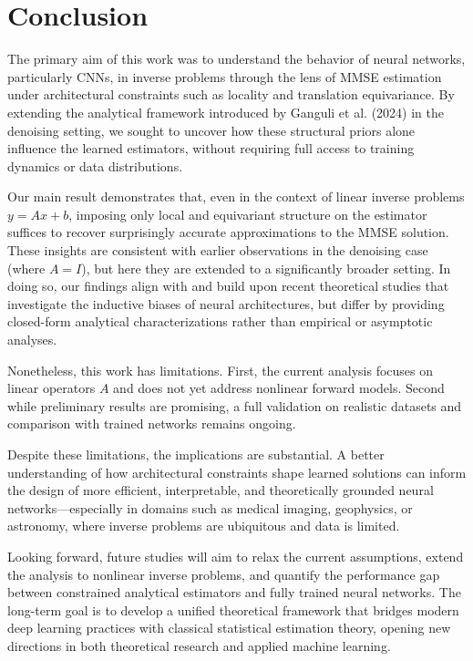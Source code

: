 \documentclass[a4paper,10pt]{article}
\theoremstyle{definition} %
\theoremstyle{definition} %
\theoremstyle{definition} %
\theoremstyle{definition} %
\newcommand{\0}{\boldsymbol{0}}
\newcommand{\X}{\mathcal{X}}
\newcommand{\Y}{\mathcal{Y}}
\newcommand{\Tx}{T^{\X}}
\newcommand{\Ty}{T^{\Y}}
\begin{document}

\section{Conclusion}
The primary aim of this work was to understand the behavior of neural networks, particularly CNNs, in inverse problems through the lens of MMSE estimation under architectural constraints such as locality and translation equivariance. By extending the analytical framework introduced by Ganguli et al. (2024) \cite{kamb2024analytictheorycreativityconvolutional} in the denoising setting, we sought to uncover how these structural priors alone influence the learned estimators, without requiring full access to training dynamics or data distributions.

Our main result demonstrates that, even in the context of linear inverse problems $y=Ax+b$, imposing only local and equivariant structure on the estimator suffices to recover surprisingly accurate approximations to the MMSE solution. These insights are consistent with earlier observations in the denoising case (where $A=I$), but here they are extended to a significantly broader setting. In doing so, our findings align with and build upon recent theoretical studies that investigate the inductive biases of neural architectures, but differ by providing closed-form analytical characterizations rather than empirical or asymptotic analyses.

Nonetheless, this work has limitations. First, the current analysis focuses on linear operators $A$ and does not yet address nonlinear forward models. Second while preliminary results are promising, a full validation on realistic datasets and comparison with trained networks remains ongoing.

Despite these limitations, the implications are substantial. A better understanding of how architectural constraints shape learned solutions can inform the design of more efficient, interpretable, and theoretically grounded neural networks—especially in domains such as medical imaging, geophysics, or astronomy, where inverse problems are ubiquitous and data is limited.

Looking forward, future studies will aim to relax the current assumptions, extend the analysis to nonlinear inverse problems, and quantify the performance gap between constrained analytical estimators and fully trained neural networks. The long-term goal is to develop a unified theoretical framework that bridges modern deep learning practices with classical statistical estimation theory, opening new directions in both theoretical research and applied machine learning.
\end{document}

